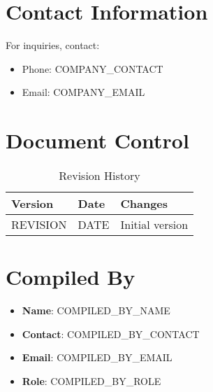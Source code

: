 \documentclass[12pt]{article}
\begin{document}
\section{Contact Information}
For inquiries, contact:
\begin{itemize}
    \item Phone: {{COMPANY_CONTACT}}
    \item Email: {{COMPANY_EMAIL}}
\end{itemize}

\section{Document Control}
\begin{table}[h]
    \centering
    \begin{tabular}{p{3cm}p{3cm}p{6cm}}
        \toprule
        \textbf{Version} & \textbf{Date} & \textbf{Changes} \\
        \midrule
        {{REVISION}} & {{DATE}} & Initial version \\
        \bottomrule
    \end{tabular}
    \caption{Revision History}
\end{table}

\section{Compiled By}
\begin{itemize}
    \item \textbf{Name}: {{COMPILED_BY_NAME}}
    \item \textbf{Contact}: {{COMPILED_BY_CONTACT}}
    \item \textbf{Email}: {{COMPILED_BY_EMAIL}}
    \item \textbf{Role}: {{COMPILED_BY_ROLE}}
\end{itemize}
\end{document}
